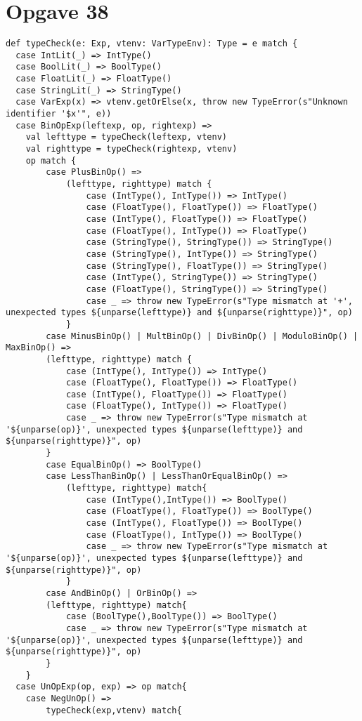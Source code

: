 \documentclass[a4paper, 10pt]{article}
\begin{document}
\section*{Opgave 38}
\begin{lstlisting}
def typeCheck(e: Exp, vtenv: VarTypeEnv): Type = e match {
  case IntLit(_) => IntType()
  case BoolLit(_) => BoolType()
  case FloatLit(_) => FloatType()
  case StringLit(_) => StringType()
  case VarExp(x) => vtenv.getOrElse(x, throw new TypeError(s"Unknown identifier '$x'", e))
  case BinOpExp(leftexp, op, rightexp) =>
  	val lefttype = typeCheck(leftexp, vtenv)
  	val righttype = typeCheck(rightexp, vtenv)
  	op match {
  		case PlusBinOp() =>
  			(lefttype, righttype) match {
  				case (IntType(), IntType()) => IntType()
  				case (FloatType(), FloatType()) => FloatType()
  				case (IntType(), FloatType()) => FloatType()
  				case (FloatType(), IntType()) => FloatType()
  				case (StringType(), StringType()) => StringType()
  				case (StringType(), IntType()) => StringType()
  				case (StringType(), FloatType()) => StringType()
  				case (IntType(), StringType()) => StringType()
  				case (FloatType(), StringType()) => StringType()
  				case _ => throw new TypeError(s"Type mismatch at '+', unexpected types ${unparse(lefttype)} and ${unparse(righttype)}", op)
  			}
  		case MinusBinOp() | MultBinOp() | DivBinOp() | ModuloBinOp() | MaxBinOp() =>
  		(lefttype, righttype) match {
	  		case (IntType(), IntType()) => IntType()
  			case (FloatType(), FloatType()) => FloatType()
  			case (IntType(), FloatType()) => FloatType()
	  		case (FloatType(), IntType()) => FloatType()
  			case _ => throw new TypeError(s"Type mismatch at '${unparse(op)}', unexpected types ${unparse(lefttype)} and ${unparse(righttype)}", op)
  		}
  		case EqualBinOp() => BoolType()
  		case LessThanBinOp() | LessThanOrEqualBinOp() =>
  			(lefttype, righttype) match{
		  		case (IntType(),IntType()) => BoolType()
		  		case (FloatType(), FloatType()) => BoolType()
		  		case (IntType(), FloatType()) => BoolType()
		  		case (FloatType(), IntType()) => BoolType()
  				case _ => throw new TypeError(s"Type mismatch at '${unparse(op)}', unexpected types ${unparse(lefttype)} and ${unparse(righttype)}", op)
	  		}
  		case AndBinOp() | OrBinOp() =>
	  	(lefttype, righttype) match{
  			case (BoolType(),BoolType()) => BoolType()
	  		case _ => throw new TypeError(s"Type mismatch at '${unparse(op)}', unexpected types ${unparse(lefttype)} and ${unparse(righttype)}", op)
	  	}
  	}
  case UnOpExp(op, exp) => op match{
  	case NegUnOp() =>
	  	typeCheck(exp,vtenv) match{

\end{lstlisting}
\end{document}
